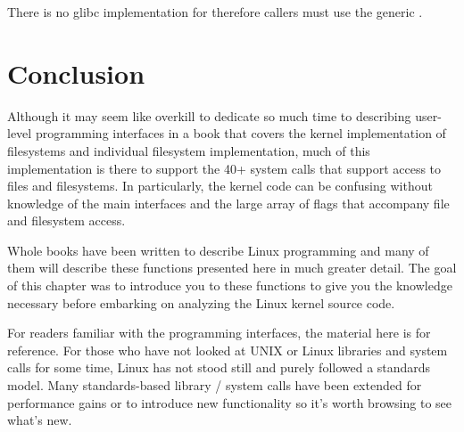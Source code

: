 \noindent
There is no glibc implementation for  therefore callers must use the generic .


\section{Conclusion}

Although it may seem like overkill to dedicate so much time to describing user-level programming interfaces in a book that covers the kernel implementation of filesystems and individual filesystem implementation, much of this implementation is there to support the 40+ system calls that support access to files and filesystems. In particularly, the kernel code can be confusing without knowledge of the main interfaces and the large array of flags that accompany file and filesystem access.

Whole books have been written to describe Linux programming and many of them will describe  these functions presented here in much greater detail. The goal of this chapter was to introduce you to these functions to give you the knowledge necessary before embarking on analyzing the Linux kernel source code.

For readers familiar with the programming interfaces, the material here is for reference. For those who have not looked at UNIX or Linux libraries and system calls for some time, Linux has not stood still and purely followed a standards model. Many standards-based library / system calls have been extended for performance gains or to introduce new functionality so it's worth browsing to see what's new.




